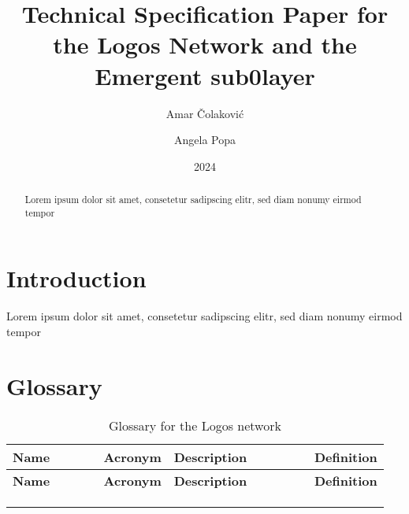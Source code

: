 \documentclass[]{article}
\title{Technical Specification Paper for the Logos Network and the Emergent sub0layer}
\author[1]{Amar Čolaković}
\author[1]{Angela Popa}
\author[2]{}
\affil[1]{LogosLabs}
\affil[2]{}
\date{ 2024}
\begin{document}
\maketitle

\begin{abstract}
Lorem ipsum dolor sit amet, consetetur sadipscing elitr, sed diam nonumy eirmod tempor       
\end{abstract}

\tableofcontents
\newpage

\section{Introduction}
Lorem ipsum dolor sit amet, consetetur sadipscing elitr, sed diam nonumy eirmod tempor 

\newpage
\printbibliography %
\newpage

\newpage
\section*{Glossary}
\begin{longtable}{p{0.3\linewidth} p{0.1\linewidth} p{0.45\linewidth} p{0.1\linewidth}}
	\textbf{Name}&\textbf{Acronym}&\textbf{Description}&\textbf{Definition}\newline \\ \hline
	\endfirsthead
	\textbf{Name}&\textbf{Acronym}&\textbf{Description}&\textbf{Definition}\newline \\ \hline
	\endhead

 &  &  &   \\ %
 &  &  &   \\ %

	\caption{Glossary for the Logos network}
\end{longtable}
\end{document}
